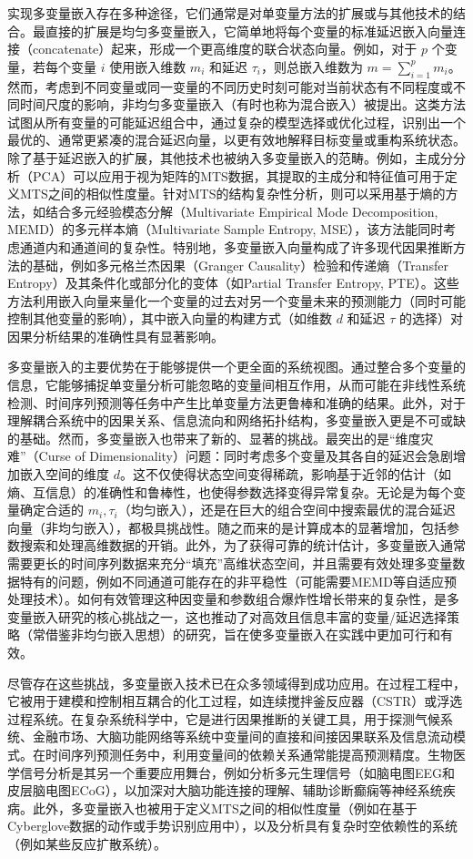 实现多变量嵌入存在多种途径，它们通常是对单变量方法的扩展或与其他技术的结合。最直接的扩展是均匀多变量嵌入，它简单地将每个变量的标准延迟嵌入向量连接（concatenate）起来，形成一个更高维度的联合状态向量。例如，对于 $p$ 个变量，若每个变量 $i$ 使用嵌入维数 $m_i$ 和延迟 $\tau_i$，则总嵌入维数为 $m = \sum_{i=1}^{p} m_i$。然而，考虑到不同变量或同一变量的不同历史时刻可能对当前状态有不同程度或不同时间尺度的影响，非均匀多变量嵌入（有时也称为混合嵌入）被提出。这类方法试图从所有变量的可能延迟组合中，通过复杂的模型选择或优化过程，识别出一个最优的、通常更紧凑的混合延迟向量，以更有效地解释目标变量或重构系统状态。除了基于延迟嵌入的扩展，其他技术也被纳入多变量嵌入的范畴。例如，主成分分析（PCA）可以应用于视为矩阵的MTS数据，其提取的主成分和特征值可用于定义MTS之间的相似性度量。针对MTS的结构复杂性分析，则可以采用基于熵的方法，如结合多元经验模态分解（Multivariate Empirical Mode Decomposition, MEMD）的多元样本熵（Multivariate Sample Entropy, MSE），该方法能同时考虑通道内和通道间的复杂性。特别地，多变量嵌入向量构成了许多现代因果推断方法的基础，例如多元格兰杰因果（Granger Causality）检验和传递熵（Transfer Entropy）及其条件化或部分化的变体（如Partial Transfer Entropy, PTE）。这些方法利用嵌入向量来量化一个变量的过去对另一个变量未来的预测能力（同时可能控制其他变量的影响），其中嵌入向量的构建方式（如维数 $d$ 和延迟 $\tau$ 的选择）对因果分析结果的准确性具有显著影响。

多变量嵌入的主要优势在于能够提供一个更全面的系统视图。通过整合多个变量的信息，它能够捕捉单变量分析可能忽略的变量间相互作用，从而可能在非线性系统检测、时间序列预测等任务中产生比单变量方法更鲁棒和准确的结果。此外，对于理解耦合系统中的因果关系、信息流向和网络拓扑结构，多变量嵌入更是不可或缺的基础。然而，多变量嵌入也带来了新的、显著的挑战。最突出的是“维度灾难”（Curse of Dimensionality）问题：同时考虑多个变量及其各自的延迟会急剧增加嵌入空间的维度 $d$。这不仅使得状态空间变得稀疏，影响基于近邻的估计（如熵、互信息）的准确性和鲁棒性，也使得参数选择变得异常复杂。无论是为每个变量确定合适的 $m_i, \tau_i$（均匀嵌入），还是在巨大的组合空间中搜索最优的混合延迟向量（非均匀嵌入），都极具挑战性。随之而来的是计算成本的显著增加，包括参数搜索和处理高维数据的开销。此外，为了获得可靠的统计估计，多变量嵌入通常需要更长的时间序列数据来充分“填充”高维状态空间，并且需要有效处理多变量数据特有的问题，例如不同通道可能存在的非平稳性（可能需要MEMD等自适应预处理技术）。如何有效管理这种因变量和参数组合爆炸性增长带来的复杂性，是多变量嵌入研究的核心挑战之一，这也推动了对高效且信息丰富的变量/延迟选择策略（常借鉴非均匀嵌入思想）的研究，旨在使多变量嵌入在实践中更加可行和有效。

尽管存在这些挑战，多变量嵌入技术已在众多领域得到成功应用。在过程工程中，它被用于建模和控制相互耦合的化工过程，如连续搅拌釜反应器（CSTR）或浮选过程系统。在复杂系统科学中，它是进行因果推断的关键工具，用于探测气候系统、金融市场、大脑功能网络等系统中变量间的直接和间接因果联系及信息流动模式。在时间序列预测任务中，利用变量间的依赖关系通常能提高预测精度。生物医学信号分析是其另一个重要应用舞台，例如分析多元生理信号（如脑电图EEG和皮层脑电图ECoG），以加深对大脑功能连接的理解、辅助诊断癫痫等神经系统疾病。此外，多变量嵌入也被用于定义MTS之间的相似性度量（例如在基于Cyberglove数据的动作或手势识别应用中），以及分析具有复杂时空依赖性的系统（例如某些反应扩散系统）。

